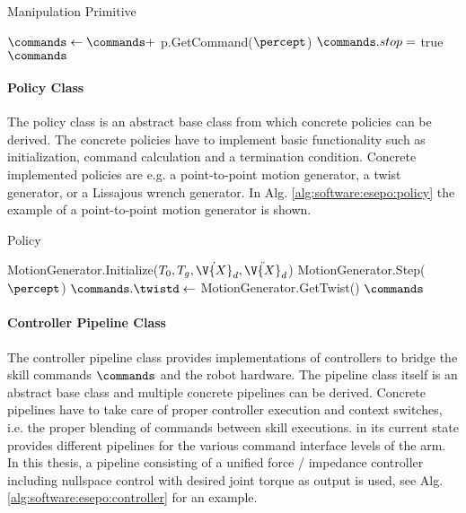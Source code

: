 \begin{algorithm}
\caption{Manipulation Primitive}\label{alg:software:esepo:primitive}
\begin{algorithmic}[1]
	$\commands \gets \commands + $ p.GetCommand($\percept$)
\EndFor
{}
	$\commands.stop = $ true
\EndIf
\Return $\commands$
\EndProcedure
\end{algorithmic}
\end{algorithm}

\paragraph{Policy Class}
The policy class is an abstract base class from which concrete policies can be derived.
The concrete policies have to implement basic functionality such as initialization, command calculation and a termination condition.
Concrete implemented policies are e.g. a point-to-point motion generator, a twist generator, or a Lissajous wrench generator.
In Alg. \ref{alg:software:esepo:policy} the example of a point-to-point motion generator is shown.

\begin{algorithm}
\caption{Policy}\label{alg:software:esepo:policy}
\begin{algorithmic}[1]
MotionGenerator.Initialize($T_0,T_g,\dot{\V{X}}_d,\ddot{\V{X}}_d$)
\EndProcedure
{}
MotionGenerator.Step($\percept$)
\State $\commands.\twistd \gets $ MotionGenerator.GetTwist()
\Return $\commands$
\EndProcedure
\end{algorithmic}
\end{algorithm}

\paragraph{Controller Pipeline Class}

The controller pipeline class provides implementations of controllers to bridge the skill commands $\commands$ and the robot hardware.
The pipeline class itself is an abstract base class and multiple concrete pipelines can be derived.
Concrete pipelines have to take care of proper controller execution and context switches, i.e. the proper blending of commands between skill executions.
\softwareabbr{} in its current state provides different pipelines for the various command interface levels of the \platformname{} arm.
In this thesis, a pipeline consisting of a unified force / impedance controller including nullspace control with desired joint torque as output is used, see Alg. \ref{alg:software:esepo:controller} for an example.

